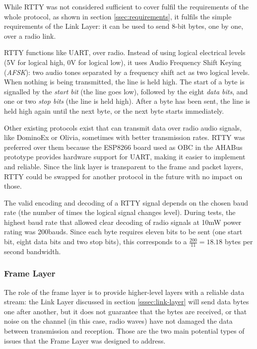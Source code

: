 
While RTTY was not considered sufficient to cover fulfil the requirements of
the whole protocol, as shown in section \ref{ssec:requirements}, it fulfils the
simple requirements of the Link Layer: it can be used to send 8-bit bytes, one
by one, over a radio link.

RTTY functions like UART, over radio. Instead of using logical electrical levels
(5V for logical high, 0V for logical low), it uses Audio Frequency Shift Keying
(\textit{AFSK}): two audio tones separated by a frequency shift act as two
logical levels. When nothing is being transmitted, the line is held high. The
start of a byte is signalled by the \textit{start bit} (the line goes low),
followed by the eight \textit{data bits}, and one or two \textit{stop bits} (the
line is held high). After a byte has been sent, the line is held high again
until the next byte, or the next byte starts immediately.

Other existing protocols exist that can transmit data over radio audio signals,
like DominoEx or Olivia, sometimes with better transmission rates. RTTY was
preferred over them because the ESP8266 board used as OBC in the AHABus
prototype provides hardware support for UART, making it easier to implement and
reliable. Since the link layer is transparent to the frame and packet layers,
RTTY could be swapped for another protocol in the future with no impact on
those.

The valid encoding and decoding of a RTTY signal depends on the chosen baud
rate (the number of times the logical signal changes level). During tests,
the highest baud rate that allowed clear decoding of radio signals at 10mW
power rating was 200bauds. Since each byte requires eleven bits to be sent
(one start bit, eight data bits and two stop bits), this corresponds to a
\(\frac{200}{11}=18.18\) bytes per second bandwidth.

\subsubsection{Frame Layer}

The role of the frame layer is to provide higher-level layers with a reliable
data stream: the Link Layer discussed in section \ref{sssec:link-layer} will
send data bytes one after another, but it does not guarantee that the bytes are
received, or that noise on the channel (in this case, radio waves) have not
damaged the data between transmission and reception. Those are the two main
potential types of issues that the Frame Layer was designed to address.

